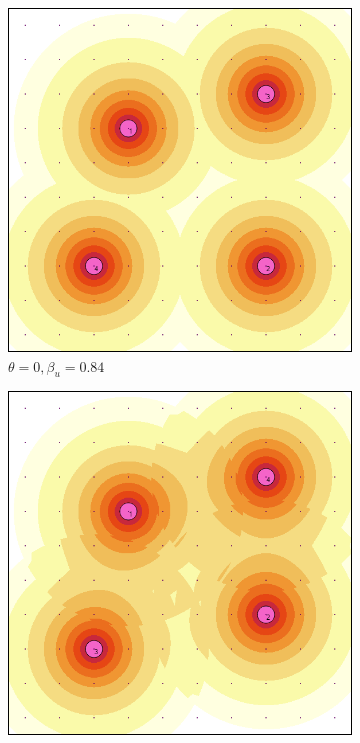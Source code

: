 \documentclass[letterpaper, 10 pt, conference]{ieeeconf}
\begin{document}
\begin{figure}[!h]
    \centering
    \begin{subfigure}[t]{0.32\columnwidth}
        \centering
        \includegraphics[width=\columnwidth]{Figures/DetFun_0.png}
        \caption{$\theta = 0, \beta_u=0.84$}
    \end{subfigure}%
    \hfill
    \begin{subfigure}[t]{0.32\columnwidth}
        \centering
        \includegraphics[width=\columnwidth]{Figures/DetFun_50.png}

\end{subfigure}
\end{figure}
\end{document}

